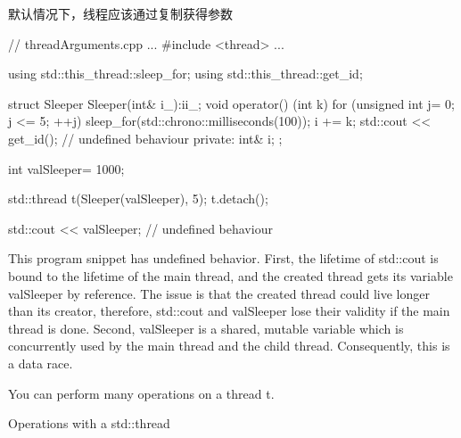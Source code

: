 \begin{myWarning}{默认情况下，线程应该通过复制获得参数}
	
\begin{cpp}
// threadArguments.cpp
...
#include <thread>
...

using std::this_thread::sleep_for;
using std::this_thread::get_id;

struct Sleeper{
	Sleeper(int& i_):i{i_}{};
	void operator() (int k){
		for (unsigned int j= 0; j <= 5; ++j){
			sleep_for(std::chrono::milliseconds(100));
			i += k;
		}
		std::cout << get_id(); // undefined behaviour
	}
	private:
	int& i;
};

int valSleeper= 1000;

std::thread t(Sleeper(valSleeper), 5);
t.detach();

std::cout << valSleeper; // undefined behaviour
\end{cpp}

This program snippet has undefined behavior. First, the lifetime of std::cout is bound to the lifetime of the main thread, and the created thread gets its variable valSleeper by reference. The issue is that the created thread could live longer than its creator, therefore, std::cout and valSleeper lose their validity if the main thread is done. Second, valSleeper is a shared, mutable variable which is concurrently used by the main thread and the child thread. Consequently, this is a data race.
\end{myWarning}


You can perform many operations on a thread t.

\begin{center}
Operations with a std::thread
\end{center}

